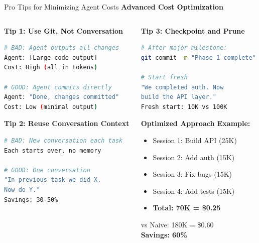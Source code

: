 \documentclass[aspectratio=169,11pt]{beamer}
\begin{document}
\begin{frame}[fragile]{Pro Tips for Minimizing Agent Costs}
    \textbf{Advanced Cost Optimization}

    \begin{columns}[T]
        \begin{column}{0.48\textwidth}
            \textbf{Tip 1: Use Git, Not Conversation}
            \begin{lstlisting}[language=Bash]
# BAD: Agent outputs all changes
Agent: [Large code output]
Cost: High (all in tokens)

# GOOD: Agent commits directly
Agent: "Done, changes committed"
Cost: Low (minimal output)
            \end{lstlisting}

            \textbf{Tip 2: Reuse Conversation Context}
            \begin{lstlisting}[language=Bash]
# BAD: New conversation each task
Each starts over, no memory

# GOOD: One conversation
"In previous task we did X.
Now do Y."
Savings: 30-50%
            \end{lstlisting}
        \end{column}
        \begin{column}{0.48\textwidth}
            \textbf{Tip 3: Checkpoint and Prune}
            \begin{lstlisting}[language=Bash]
# After major milestone:
git commit -m "Phase 1 complete"

# Start fresh
"We completed auth. Now
build the API layer."
Fresh start: 10K vs 100K
            \end{lstlisting}

            \textbf{Optimized Approach Example:}
            \begin{itemize}
                \item Session 1: Build API (25K)
                \item Session 2: Add auth (15K)
                \item Session 3: Fix bugs (15K)
                \item Session 4: Add tests (15K)
                \item \textbf{Total: 70K = \$0.25}
            \end{itemize}
            vs Naive: 180K = \$0.60\\
            \textbf{Savings: 60\%}
        \end{column}
    \end{columns}
\end{frame}
\end{document}
